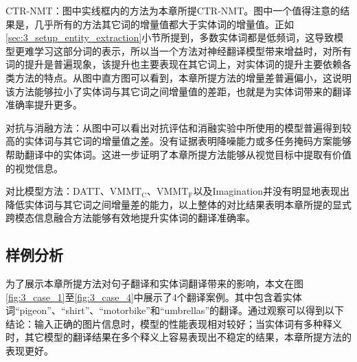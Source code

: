 {\sffamily CTR-NMT：}图中实线框内的方法为本章所提CTR-NMT。图中一个值得注意的结果是，几乎所有的方法其它词的增量值都大于实体词的增量值。正如\ref{sec:3_setup_entity_extraction}小节所提到，多数实体词都是低频词，这导致模型更难学习这部分词的表示，所以当一个方法对神经翻译模型带来增益时，对所有词的提升是普遍现象，该提升也主要表现在其它词上，对实体词的提升主要依赖各类方法的特点。从图中直方图可以看到，本章所提方法的增量差普遍偏小，这说明该方法能够拉小了实体词与其它词之间增量值的差距，也就是为实体词带来的翻译准确率提升更多。

{\sffamily 对抗与消融方法：}从图中可以看出对抗评估和消融实验中所使用的模型普遍得到较高的实体词与其它词的增量值之差。没有证据表明降噪能力或多任务掩码方案能够帮助翻译中的实体词。这进一步证明了本章所提方法能够从视觉目标中提取有价值的视觉信息。

{\sffamily 对比模型方法：}DATT、$ \mathrm{VMMT_C} $、$ \mathrm{VMMT_F} $以及Imagination并没有明显地表现出降低实体词与其它词之间增量差的能力，以上整体的对比结果表明本章所提的显式跨模态信息融合方法能够有效地提升实体词的翻译准确率。

\subsection{样例分析}




为了展示本章所提方法对句子翻译和实体词翻译带来的影响，本文在图\ref{fig:3_case_1}至\ref{fig:3_case_4}中展示了4个翻译案例。其中包含着实体词“pigeon”、“shirt”、“motorbike”和“umbrellas”的翻译。通过观察可以得到以下结论：输入正确的图片信息时，模型的性能表现相对较好；当实体词有多种释义时，其它模型的翻译结果在多个释义上容易表现出不稳定的结果，本章所提方法的表现更好。